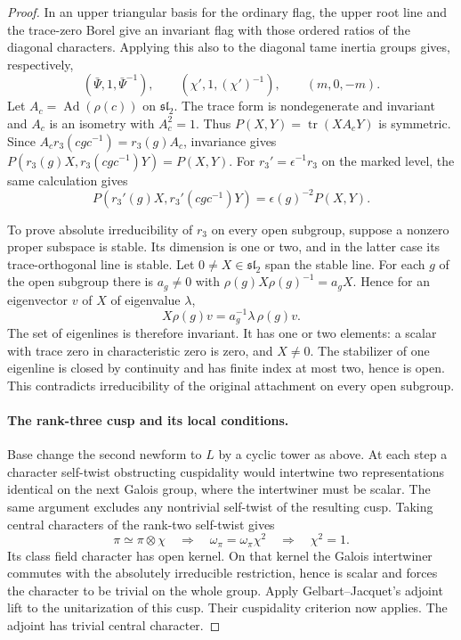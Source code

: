 \begin{proof}
In an upper
triangular basis for the ordinary flag, the upper root line and
the trace-zero Borel give an invariant flag with those ordered
ratios of the diagonal characters. Applying this also to the
diagonal tame inertia groups gives, respectively,
\[
 (\bar\Psi,1,\bar\Psi^{-1}),\qquad
 (\chi',1,(\chi')^{-1}),\qquad (m,0,-m).
\]
Let \(A_c=\operatorname{Ad}(\rho(c))\) on \(\mathfrak{sl}_2\).
The trace form is nondegenerate and invariant and \(A_c\)
is an isometry with \(A_c^2=1\). Thus
\(P(X,Y)=\operatorname{tr}(X A_cY)\) is symmetric.
Since \(A_c r_3(cgc^{-1})=r_3(g) A_c\), invariance gives
\(P(r_3(g)X,r_3(cgc^{-1})Y)=P(X,Y)\).
For \(r_3'=\epsilon^{-1}r_3\) on the marked level, the
same calculation gives
\[
 P(r_3'(g)X,r_3'(cgc^{-1})Y)=\epsilon(g)^{-2}P(X,Y).
\]

To prove absolute irreducibility of \(r_3\) on every open subgroup,
suppose a nonzero proper subspace is stable. Its dimension is one
or two, and in the latter case its trace-orthogonal line is stable.
Let \(0\ne X\in\mathfrak{sl}_2\) span the stable line.
For each \(g\) of the open subgroup there is \(a_g\ne0\)
with \(\rho(g)X\rho(g)^{-1}=a_gX\). Hence for an eigenvector
\(v\) of \(X\) of eigenvalue \(\lambda\),
\[
                   X\rho(g)v=a_g^{-1}\lambda\,\rho(g)v .
\]
The set of eigenlines is therefore invariant. It has one
or two elements: a scalar with trace zero in characteristic
zero is zero, and \(X\ne0\). The stabilizer of one eigenline
is closed by continuity and has finite index at most two,
hence is open. This contradicts irreducibility of the
original attachment on every open subgroup.

\paragraph{The rank-three cusp and its local conditions.}
Base change the second newform to \(L\) by a cyclic tower as
above. At each step a character self-twist obstructing cuspidality
would intertwine two representations identical on the next
Galois group, where the intertwiner must be scalar. The same
argument excludes any nontrivial self-twist of the resulting cusp.
Taking central characters of the rank-two self-twist gives
\[
 \pi\simeq\pi\otimes\chi\quad\Longrightarrow\quad \omega_\pi=\omega_\pi\chi^2\quad\Longrightarrow\quad\chi^2=1 .
\] Its class field character has open kernel.
On that kernel the Galois intertwiner commutes with
the absolutely irreducible restriction, hence is scalar
and forces the character to be trivial on the whole group.
Apply Gelbart--Jacquet's adjoint lift to the unitarization of
this cusp. Their cuspidality criterion now applies. The adjoint has trivial central character.


\end{proof}
